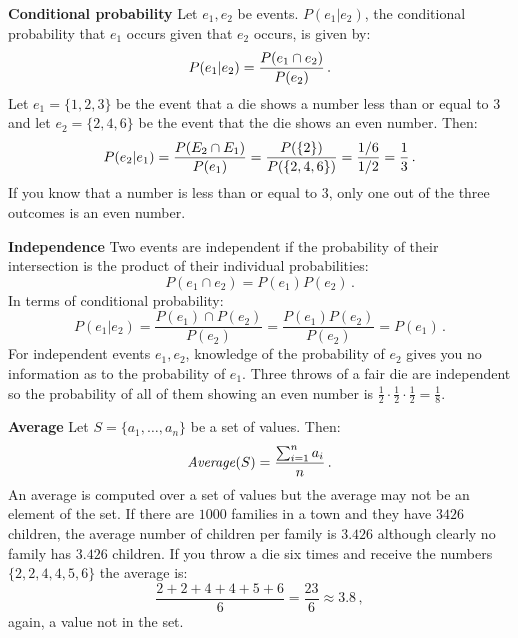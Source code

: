 \textbf{Conditional probability} Let $e_1,e_2$ be events.  $P(e_1 | e_2)$, the conditional probability that $e_1$ occurs given that $e_2$ occurs, is given by:
\[
P(e_1 | e_2) = \displaystyle\frac{P(e_1 \cap e_2)}{P(e_2)}\,.
\]
Let $e_1=\{1,2,3\}$ be the event that a die shows a number less than or equal to $3$ and let $e_2=\{2,4,6\}$ be the event that the die shows an even number. Then:
\[
P(e_2 | e_1) = \displaystyle\frac{P(E_2 \cap E_1)}{P(e_1)}=\displaystyle\frac{P(\{2\})}{P(\{2,4,6\})}= \displaystyle\frac{1/6}{1/2}=\displaystyle\frac{1}{3}\,.
\]
If you know that a number is less than or equal to $3$, only one out of the three outcomes is an even number.

\textbf{Independence} Two events are independent if the probability of their intersection is the product of their individual probabilities:
\[
P(e_1 \cap e_2)=P(e_1)P(e_2)\,.
\]
In terms of conditional probability:
\[
P(e_1 | e_2)=\frac{P(e_1)\cap P(e_2)}{P(e_2)} = \frac{P(e_1)P(e_2)}{P(e_2)}=P(e_1)\,. 
\]
For independent events $e_1,e_2$, knowledge of the probability of $e_2$ gives you no information as to the probability of $e_1$. Three throws of a fair die are independent so the probability of all of them showing an even number is $\frac{1}{2}\cdot \frac{1}{2}\cdot \frac{1}{2}=\frac{1}{8}$. 

\textbf{Average}
Let $S=\{a_1,\ldots,a_n\}$ be a set of values. Then:
\[
\mathit{Average}(S)=\displaystyle\frac{\sum_{i=1}^{n} a_i}{n}\,.
\]
An average is computed over a set of values but the average may not be an element of the set. If there are $1000$ families in a town and they have $3426$ children, the average number of children per family is $3.426$ although clearly no family has $3.426$ children. If you throw a die six times and receive the numbers $\{2,2,4,4,5,6\}$ the average is:
\[
\frac{2+2+4+4+5+6}{6}=\frac{23}{6}\approx 3.8\,,
\]
again, a value not in the set.

